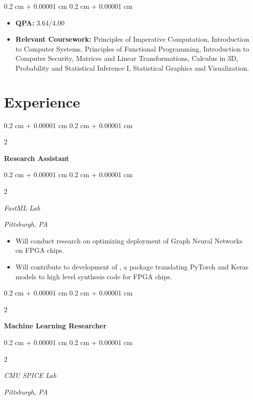 \documentclass[10pt, letterpaper]{article}
\newenvironment{highlights}{
    \begin{itemize}[
        topsep=0.10 cm,
        parsep=0.10 cm,
        partopsep=0pt,
        itemsep=0pt,
        leftmargin=0.4 cm + 10pt
    ]
}{
    \end{itemize}
} %
\newenvironment{onecolentry}{
    \begin{adjustwidth}{
        0.2 cm + 0.00001 cm
    }{
        0.2 cm + 0.00001 cm
    }
}{
    \end{adjustwidth}
} %
\newenvironment{twocolentry}[2][]{
    \onecolentry
    \def\secondColumn{#2}
    \setcolumnwidth{\fill, 4.5 cm}
    \begin{paracol}{2}
}{
    \switchcolumn \raggedleft \secondColumn
    \end{paracol}
    \endonecolentry
} %
\let\hrefWithoutArrow\href
\renewcommand{\href}[2]{\hrefWithoutArrow{#1}{\ifthenelse{\equal{#2}{}}{ }{#2 }\raisebox{.15ex}{\footnotesize \faExternalLink*}}}
\begin{document}
        \vspace{0.10 cm}
        \begin{onecolentry}
            \begin{highlights}
                \item \textbf{QPA:} 3.64/4.00 
                \item \textbf{Relevant Coursework:} Principles of Imperative Computation, Introduction to Computer Systems, Principles of Functional Programming, Introduction to Computer Security, Matrices and Linear Transformations, Calculus in 3D, Probability and Statistical Inference I, Statistical Graphics and Visualization.
            \end{highlights}
        \end{onecolentry}
    
    \section{Experience}
        \begin{twocolentry}{
            }
            \textbf{Research Assistant}
        \end{twocolentry}
        \begin{twocolentry}{
            \textit{Pittsburgh, PA}}
            \textit{FastML Lab}
        \end{twocolentry}

        \vspace{0.10 cm}
            \begin{highlights}
                \item Will conduct research on optimizing deployment of Graph Neural Networks on FPGA chips. 
                \item Will contribute to development of \href{https://fastmachinelearning.org/hls4ml/intro/introduction.html}{hls4ml}, a package translating PyTorch and Keras models to high level synthesis code for FPGA chips.
            \end{highlights}
        \begin{twocolentry}{
        }
            \textbf{Machine Learning Researcher}
        \end{twocolentry}
        \begin{twocolentry}{
            \textit{Pittsburgh, PA}}
        \textit{CMU SPICE Lab}
        \end{twocolentry}
\end{document}
